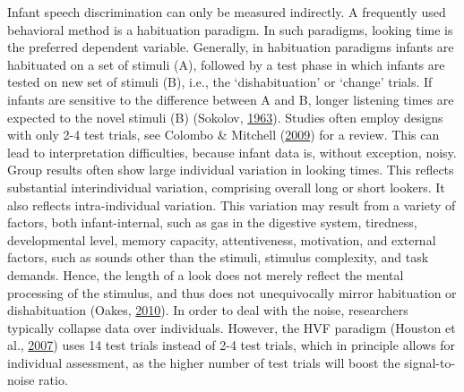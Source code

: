 \documentclass[openright,titlepage,12pt,a4paper]{book}
\begin{document}
Infant speech discrimination can only be measured indirectly. A frequently used behavioral method is a habituation paradigm. In such paradigms, looking time is the preferred dependent variable. Generally, in habituation paradigms infants are habituated on a set of stimuli (A), followed by a test phase in which infants are tested on new set of stimuli (B), i.e., the `dishabituation' or `change' trials. If infants are sensitive to the difference between A and B, longer listening times are expected to the novel stimuli (B) (Sokolov, \protect\hyperlink{ref-sokolov_perception_1963}{1963}). Studies often employ designs with only 2-4 test trials, see Colombo \& Mitchell (\protect\hyperlink{ref-colombo_infant_2009}{2009}) for a review. This can lead to interpretation difficulties, because infant data is, without exception, noisy. Group results often show large individual variation in looking times. This reflects substantial interindividual variation, comprising overall long or short lookers. It also reflects intra-individual variation. This variation may result from a variety of factors, both infant-internal, such as gas in the digestive system, tiredness, developmental level, memory capacity, attentiveness, motivation, and external factors, such as sounds other than the stimuli, stimulus complexity, and task demands. Hence, the length of a look does not merely reflect the mental processing of the stimulus, and thus does not unequivocally mirror habituation or dishabituation (Oakes, \protect\hyperlink{ref-oakes_using_2010}{2010}). In order to deal with the noise, researchers typically collapse data over individuals. However, the HVF paradigm (Houston et al., \protect\hyperlink{ref-houston_assessing_2007}{2007}) uses 14 test trials instead of 2-4 test trials, which in principle allows for individual assessment, as the higher number of test trials will boost the signal-to-noise ratio.
\end{document}
